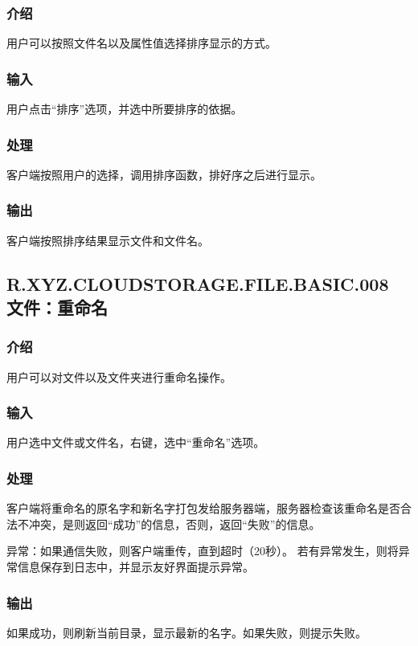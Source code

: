 \subsubsection{介绍} 
用户可以按照文件名以及属性值选择排序显示的方式。

\subsubsection{输入} 
用户点击“排序”选项，并选中所要排序的依据。

\subsubsection{处理}
客户端按照用户的选择，调用排序函数，排好序之后进行显示。

\subsubsection{输出}
客户端按照排序结果显示文件和文件名。



\subsection{R.XYZ.CLOUDSTORAGE.FILE.BASIC.008 文件：重命名}

\subsubsection{介绍} 
用户可以对文件以及文件夹进行重命名操作。

\subsubsection{输入} 
用户选中文件或文件名，右键，选中“重命名”选项。

\subsubsection{处理}
客户端将重命名的原名字和新名字打包发给服务器端，服务器检查该重命名是否合法不冲突，是则返回“成功”的信息，否则，返回“失败”的信息。

异常：如果通信失败，则客户端重传，直到超时（20秒）。
若有异常发生，则将异常信息保存到日志中，并显示友好界面提示异常。

\subsubsection{输出}
如果成功，则刷新当前目录，显示最新的名字。如果失败，则提示失败。




